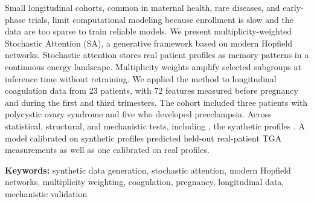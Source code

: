 Small longitudinal cohorts, common in maternal health, rare diseases, and early-phase trials,
limit computational modeling because enrollment is slow and the data are too sparse to train
reliable models. We present multiplicity-weighted Stochastic Attention (SA), a generative
framework based on modern Hopfield networks. Stochastic attention stores real patient profiles
as memory patterns in a continuous energy landscape.  Multiplicity weights amplify selected subgroups at
inference time without retraining. We applied the method to longitudinal coagulation data from
23 patients, with 72 features measured before pregnancy and during the first and third
trimesters. The cohort included three patients with polycystic ovary syndrome and five who
developed preeclampsia. Across statistical, structural, and mechanistic tests, including
, the synthetic profiles . A model calibrated on synthetic profiles predicted
held-out real-patient TGA measurements as well as one calibrated on real profiles. 

\medskip
\noindent\textbf{Keywords:} synthetic data generation, stochastic attention, modern Hopfield networks,
multiplicity weighting, coagulation, pregnancy, longitudinal data, mechanistic validation
